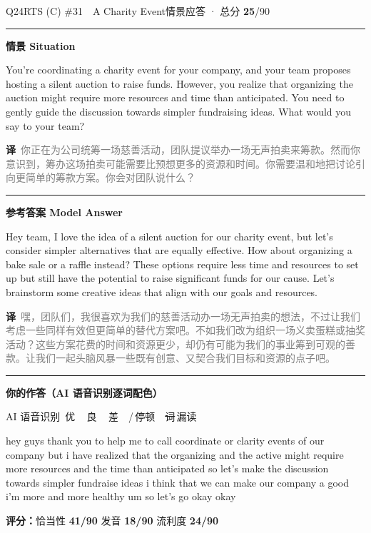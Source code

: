 \documentclass[11pt]{article}
\newcommand{\spart}[1]{\textcolor{cPartial}{\bfseries #1}} %
\newcommand{\szero}[1]{\textcolor{cWrong}{\bfseries #1}}   %
\newcommand{\ptesub}[1]{%
  \par\needspace{2\baselineskip}\smallskip
  {\color{cAccent}\rule[-0.2ex]{3pt}{1.05em}}\hspace{6pt}%
  {\bfseries\color{cHead}#1}\par\nopagebreak\smallskip}
\newcommand{\sg}[1]{\textcolor{cSpkGood}{#1}}   %
\newcommand{\sy}[1]{\textcolor{cSpkOk}{#1}}     %
\newcommand{\sr}[1]{\textcolor{cSpkBad}{#1}}    %
\newcommand{\asrlegend}{{\footnotesize\color{gray}AI 语音识别\quad
  {\color{cSpkGood}\textbullet}\,优\ \ {\color{cSpkOk}\textbullet}\,良\ \
  {\color{cSpkBad}\textbullet}\,差\ \ {\color{gray}/}\,停顿\ \
  {\color{cSpkBad}\sout{词}}\,漏读}}
\newcommand{\zh}[1]{{\footnotesize\textcolor{cNote}{\textbf{译}}\ \textcolor{gray}{#1}}}
\begin{document}
\begin{qblock}{Q24\quad RTS (C) \#31\ \ A Charity Event}{情景应答 · 总分 \textcolor{cAccent}{\bfseries 25}/90}
\ptesub{情景 Situation}
\begin{promptbox}
You're coordinating a charity event for your company, and your team proposes hosting a silent auction to raise funds. However, you realize that organizing the auction might require more resources and time than anticipated. You need to gently guide the discussion towards simpler fundraising ideas. What would you say to your team?
\end{promptbox}
\zh{你正在为公司统筹一场慈善活动，团队提议举办一场无声拍卖来筹款。然而你意识到，筹办这场拍卖可能需要比预想更多的资源和时间。你需要温和地把讨论引向更简单的筹款方案。你会对团队说什么？}
\ptesub{参考答案 Model Answer}
\begin{modelbox}
Hey team, I love the idea of a silent auction for our charity event, but let's consider simpler alternatives that are equally effective. How about organizing a bake sale or a raffle instead? These options require less time and resources to set up but still have the potential to raise significant funds for our cause. Let's brainstorm some creative ideas that align with our goals and resources.
\end{modelbox}
\zh{嘿，团队们，我很喜欢为我们的慈善活动办一场无声拍卖的想法，不过让我们考虑一些同样有效但更简单的替代方案吧。不如我们改为组织一场义卖蛋糕或抽奖活动？这些方案花费的时间和资源更少，却仍有可能为我们的事业筹到可观的善款。让我们一起头脑风暴一些既有创意、又契合我们目标和资源的点子吧。}
\ptesub{你的作答（AI 语音识别逐词配色）}
\asrlegend
\begin{asrbox}
\sg{hey} \sg{guys} \sy{thank} \sg{you} \sg{to} \sg{help} \sg{me} \sg{to} \sg{call} \sy{coordinate} \sy{or} \sy{clarity} \sg{events} \sy{of} \sg{our} \sg{company} \sg{but} \sg{i} \sg{have} \sg{realized} \sg{that} \sy{the} \sg{organizing} \sg{and} \sy{the} \sy{active} \sy{might} \sg{require} \sg{more} \sg{resources} \sg{and} \sg{the} \sy{time} \sr{than} \sy{anticipated} \sy{so} \sg{let's} \sg{make} \sg{the} \sg{discussion} \sr{towards} \sg{simpler} \sy{fundraise} \sg{ideas} \sy{i} \sg{think} \sg{that} \sy{we} \sg{can} \sg{make} \sy{our} \sg{company} \sy{a} \sy{good} \sr{i'm} \sy{more} \sy{and} \sy{more} \sg{healthy} \sy{um} \sy{so} \sg{let's} \sg{go} \sr{okay} \sr{okay}
\end{asrbox}
\smallskip
{\small\textbf{评分：}恰当性 \spart{41/90} \quad\textperiodcentered\quad 发音 \szero{18/90} \quad\textperiodcentered\quad 流利度 \spart{24/90}}
\end{qblock}
\end{document}
